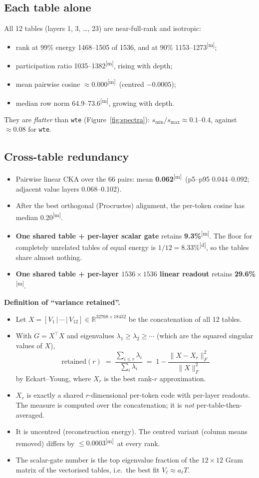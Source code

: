 \documentclass[11pt]{article}
\newcommand{\meas}{\textsuperscript{[m]}}   %
\newcommand{\der}{\textsuperscript{[d]}}    %
\begin{document}
\subsection{Each table alone}
All 12 tables (layers 1, 3, \ldots, 23) are near-full-rank and isotropic:
\begin{itemize}
\item rank at 99\% energy 1468--1505 of 1536, and at 90\% 1153--1273\meas;
\item participation ratio 1035--1382\meas, rising with depth;
\item mean pairwise cosine $\approx 0.000$\meas\ (centred $-0.0005$);
\item median row norm 64.9--73.6\meas, growing with depth.
\end{itemize}
They are \emph{flatter} than \texttt{wte} (Figure~\ref{fig:spectra}): $s_{\min}/s_{\max}\approx 0.1$--$0.4$, against ${\approx}0.08$ for \texttt{wte}.

\subsection{Cross-table redundancy}
\begin{itemize}
\item Pairwise linear CKA over the 66 pairs: mean \textbf{0.062}\meas\ (p5--p95 0.044--0.092; adjacent value layers 0.068--0.102).
\item After the best orthogonal (Procrustes) alignment, the per-token cosine has median 0.20\meas.
\item \textbf{One shared table + per-layer scalar gate} retains \textbf{9.3\%}\meas. The floor for completely unrelated tables of equal energy is $1/12 = 8.33\%$\der, so the tables share almost nothing.
\item \textbf{One shared table + per-layer $1536{\times}1536$ linear readout} retains \textbf{29.6\%}\meas.
\end{itemize}

\textbf{Definition of ``variance retained''.}
\begin{itemize}
\item Let $X = [V_1 \,|\, \cdots \,|\, V_{12}] \in \mathbb{R}^{32768\times 18432}$ be the concatenation of all 12 tables.
\item With $G = X^\top X$ and eigenvalues $\lambda_1\ge\lambda_2\ge\cdots$ (which are the squared singular values of $X$),
\[
\text{retained}(r) \;=\; \frac{\sum_{i\le r}\lambda_i}{\sum_i \lambda_i} \;=\; 1 - \frac{\|X - X_r\|_F^2}{\|X\|_F^2}
\]
by Eckart--Young, where $X_r$ is the best rank-$r$ approximation.
\item $X_r$ is exactly a shared $r$-dimensional per-token code with per-layer readouts. The measure is computed over the concatenation; it is \emph{not} per-table-then-averaged.
\item It is uncentred (reconstruction energy). The centred variant (column means removed) differs by $\le 0.0003$\meas\ at every rank.
\item The scalar-gate number is the top eigenvalue fraction of the $12\times 12$ Gram matrix of the vectorised tables, i.e.\ the best fit $V_\ell \approx a_\ell T$.
\end{itemize}
\end{document}
